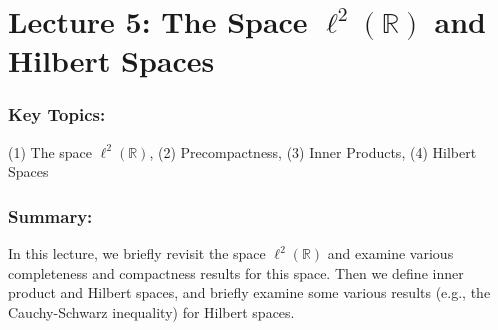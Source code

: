 \documentclass{article}
\begin{document}
\newpage 
\section{Lecture 5: The Space \texorpdfstring{$\ell^{2}(\mathbb{R})$}{l2(R)} and Hilbert Spaces}
\subsubsection{Key Topics:}
(1) The space $\ell^{2}(\mathbb{R})$, (2) Precompactness, (3) Inner Products, (4) Hilbert Spaces
\subsubsection{Summary:}
In this lecture, we briefly revisit the space $\ell^{2}(\mathbb{R})$ and examine various completeness and compactness results for this space. Then we define inner product and Hilbert spaces, and briefly examine some various results (e.g., the Cauchy-Schwarz inequality) for Hilbert spaces. 
\end{document}
